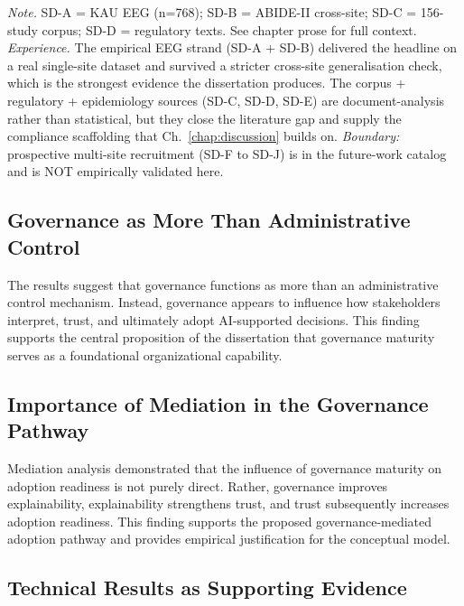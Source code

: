 \vspace{0.3em}\noindent\textit{Note.} SD-A = KAU EEG (n=768); SD-B = ABIDE-II cross-site; SD-C = 156-study corpus; SD-D = regulatory texts. See chapter prose for full context.
\vspace{0.5em}\noindent\textit{Experience.} The empirical EEG strand (SD-A + SD-B) delivered the headline \asdacc{} on a real single-site dataset and survived a stricter cross-site generalisation check, which is the strongest evidence the dissertation produces. The corpus + regulatory + epidemiology sources (SD-C, SD-D, SD-E) are document-analysis rather than statistical, but they close the literature gap and supply the compliance scaffolding that Ch.~\ref{chap:discussion} builds on. \emph{Boundary:} prospective multi-site recruitment (SD-F to SD-J) is in the future-work catalog and is NOT empirically validated here.


\subsection{Governance as More Than Administrative Control}
\label{sec:governance_more_than_control}

\noindent The results suggest that governance functions as more than an administrative control mechanism. Instead, governance appears to influence how stakeholders interpret, trust, and ultimately adopt AI-supported decisions. This finding supports the central proposition of the dissertation that governance maturity serves as a foundational organizational capability.


\subsection{Importance of Mediation in the Governance Pathway}
\label{sec:mediation_importance}

\noindent Mediation analysis demonstrated that the influence of governance maturity on adoption readiness is not purely direct. Rather, governance improves explainability, explainability strengthens trust, and trust subsequently increases adoption readiness. This finding supports the proposed governance-mediated adoption pathway and provides empirical justification for the conceptual model.


\subsection{Technical Results as Supporting Evidence}
\label{sec:technical_results_supporting}

